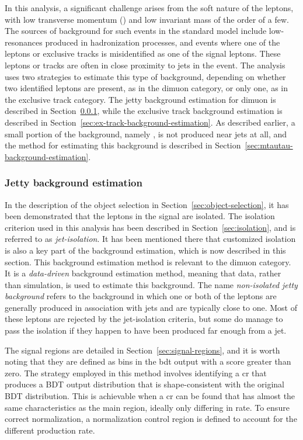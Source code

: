 In this analysis, a significant challenge arises from the soft nature of the leptons, with low transverse momentum (\pt) and low invariant mass of the order of a few\GeV. The sources of background for such events in the standard model include low-\pt resonances produced in hadronization processes, and events where one of the leptons or exclusive tracks is misidentified as one of the signal leptons. These leptons or tracks are often in close proximity to jets in the event. The analysis uses two strategies to estimate this type of background, depending on whether two identified leptons are present, as in the dimuon category, or only one, as in the exclusive track category. The jetty background estimation for dimuon is described in Section~\ref{sec:jetty-background-estimation}, while the exclusive track background estimation is described in Section~\ref{sec:ex-track-background-estimation}. As described earlier, a small portion of the background, namely \ztautau, is not produced near jets at all, and the method for estimating this background is described in Section~\ref{sec:mtautau-background-estimation}.

\clearpage
\subsubsection{Jetty background estimation}
\label{sec:jetty-background-estimation}

In the description of the object selection in Section~\ref{sec:object-selection}, it has been demonstrated that the leptons in the signal are isolated. The isolation criterion used in this analysis has been described in Section~\ref{sec:isolation}, and is referred to as \emph{jet-isolation}. It has been mentioned there that customized isolation is also a key part of the background estimation, which is now described in this section. This background estimation method is relevant to the dimuon category. It is a \emph{data-driven} background estimation method, meaning that data, rather than simulation, is used to estimate this background. The name \emph{non-isolated jetty background} refers to the background in which one or both of the leptons are generally produced in association with jets and are typically close to one. Most of these leptons are rejected by the jet-isolation criteria, but some do manage to pass the isolation if they happen to have been produced far enough from a jet.

The signal regions are detailed in Section~\ref{sec:signal-regions}, and it is worth noting that they are defined as bins in the \gls{bdt} output with a score greater than zero. The strategy employed in this method involves identifying a \gls{cr} that produces a BDT output distribution that is shape-consistent with the original BDT distribution. This is achievable when a \gls{cr} can be found that has almost the same characteristics as the main region, ideally only differing in rate. To ensure correct normalization, a normalization control region is defined to account for the different production rate.

